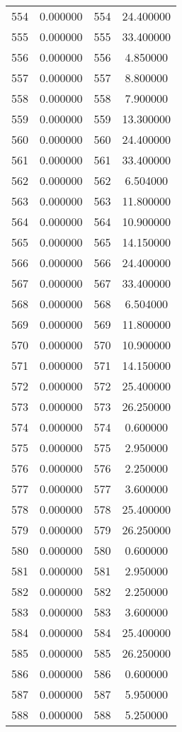 \documentclass[12pt]{article}
\begin{document}
\begin{longtable}{@{}cccc@{}}
554 & 0.000000 & 554 & 24.400000 \\
555 & 0.000000 & 555 & 33.400000 \\
556 & 0.000000 & 556 & 4.850000 \\
557 & 0.000000 & 557 & 8.800000 \\
558 & 0.000000 & 558 & 7.900000 \\
559 & 0.000000 & 559 & 13.300000 \\
560 & 0.000000 & 560 & 24.400000 \\
561 & 0.000000 & 561 & 33.400000 \\
562 & 0.000000 & 562 & 6.504000 \\
563 & 0.000000 & 563 & 11.800000 \\
564 & 0.000000 & 564 & 10.900000 \\
565 & 0.000000 & 565 & 14.150000 \\
566 & 0.000000 & 566 & 24.400000 \\
567 & 0.000000 & 567 & 33.400000 \\
568 & 0.000000 & 568 & 6.504000 \\
569 & 0.000000 & 569 & 11.800000 \\
570 & 0.000000 & 570 & 10.900000 \\
571 & 0.000000 & 571 & 14.150000 \\
572 & 0.000000 & 572 & 25.400000 \\
573 & 0.000000 & 573 & 26.250000 \\
574 & 0.000000 & 574 & 0.600000 \\
575 & 0.000000 & 575 & 2.950000 \\
576 & 0.000000 & 576 & 2.250000 \\
577 & 0.000000 & 577 & 3.600000 \\
578 & 0.000000 & 578 & 25.400000 \\
579 & 0.000000 & 579 & 26.250000 \\
580 & 0.000000 & 580 & 0.600000 \\
581 & 0.000000 & 581 & 2.950000 \\
582 & 0.000000 & 582 & 2.250000 \\
583 & 0.000000 & 583 & 3.600000 \\
584 & 0.000000 & 584 & 25.400000 \\
585 & 0.000000 & 585 & 26.250000 \\
586 & 0.000000 & 586 & 0.600000 \\
587 & 0.000000 & 587 & 5.950000 \\
588 & 0.000000 & 588 & 5.250000 \\

\end{longtable}
\end{document}
